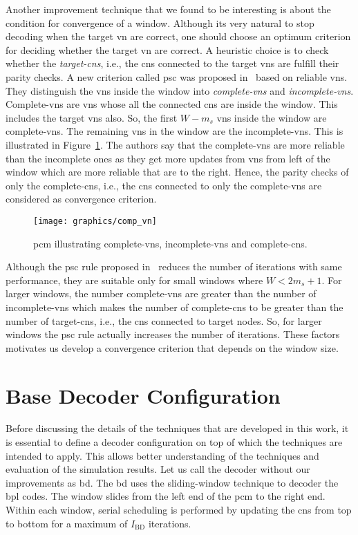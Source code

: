 Another improvement technique that we found to be interesting is about the condition for convergence of a window. Although its very natural to stop decoding when the target \gls{vn} are correct, one should choose an optimum criterion for deciding whether the target \gls{vn} are correct. A heuristic choice is to check whether the \emph{target-\glspl{cn}}, i.e., the \glspl{cn} connected to the target \glspl{vn} are fulfill their parity checks. A new criterion called \gls{psc} was proposed in~\cite{Kang2018} based on reliable \glspl{vn}. They distinguish the \glspl{vn} inside the window into \emph{complete-\glspl{vn}} and \emph{incomplete-\glspl{vn}}. Complete-\glspl{vn} are \glspl{vn} whose all the connected \glspl{cn} are inside the window. This includes the target \glspl{vn} also. So, the first $W-m_s$ \glspl{vn} inside the window are complete-\glspl{vn}. The remaining \glspl{vn} in the window are the incomplete-\glspl{vn}. This is illustrated in Figure~\ref{fig:comp_vn}. The authors say that the complete-\glspl{vn} are more reliable than the incomplete ones as they get more updates from \glspl{vn} from left of the window which are more reliable that are to the right. Hence, the parity checks of only the complete-\glspl{cn}, i.e., the \glspl{cn} connected to only the complete-\glspl{vn} are considered as convergence criterion.
\begin{figure}[htbp]
  \centering
  \texttt{[image: graphics/comp\_vn]}
  \caption[Illustration of different categories.]{\gls{pcm} illustrating complete-\glspl{vn}, incomplete-\glspl{vn} and complete-\glspl{cn}.}
  \label{fig:comp_vn}
\end{figure}

Although the \gls{psc} rule proposed in~\cite{Kang2018} reduces the number of iterations with same performance, they are suitable only for small windows where $W<2m_s+1$. For larger windows, the number complete-\glspl{vn} are greater than the number of incomplete-\glspl{vn} which makes the number of complete-\glspl{cn} to be greater than the number of target-\glspl{cn}, i.e., the \glspl{cn} connected to target nodes. So, for larger windows the \gls{psc} rule actually increases the number of iterations. These factors motivates us develop a convergence criterion that depends on the window size.

\section{Base Decoder Configuration}
Before discussing the details of the techniques that are developed in this work, it is essential to define a decoder configuration on top of which the techniques are intended to apply. This allows better understanding of the techniques and evaluation of the simulation results. Let us call the decoder without our improvements as \gls{bd}. The \gls{bd} uses the sliding-window technique to decoder the \gls{bpl} codes. The window slides from the left end of the \gls{pcm} to the right end. Within each window, serial scheduling is performed by updating the \glspl{cn} from top to bottom for a maximum of $I_{\text{BD}}$ iterations.

